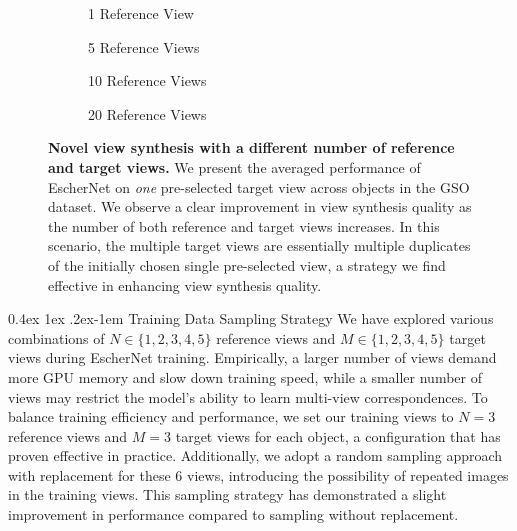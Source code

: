 \documentclass[10pt,twocolumn,letterpaper]{article}
\makeatletter
\renewcommand{\paragraph}{%
  \@startsection{paragraph}{4}%
  {\z@}{0.4ex \@plus 1ex \@minus .2ex}{-1em}%
  {\normalfont\normalsize\bfseries}%
}
\makeatother
\begin{document}
\begin{figure}[ht!]
  \flushleft
  \captionsetup[subfigure]{font=footnotesize}
  \begin{subfigure}[b]{0.24\linewidth}
  \centering
    \resizebox{\linewidth}{!}{{}}
  \caption{1 Reference View}
  \end{subfigure}\hfill
  \begin{subfigure}[b]{0.24\linewidth}
  \centering
    \resizebox{\linewidth}{!}{{}}
  \caption{5 Reference Views}
  \end{subfigure}\hfill
    \begin{subfigure}[b]{0.24\linewidth}
  \centering
    \resizebox{\linewidth}{!}{{}}
  \caption{10 Reference Views}
  \end{subfigure}
  \hfill
    \begin{subfigure}[b]{0.24\linewidth}
  \centering
    \resizebox{\linewidth}{!}{{}}
  \caption{20 Reference Views}
  \end{subfigure}
  \caption{{\bf Novel view synthesis with a different number of reference and target views.} We present the averaged performance of EscherNet on {\it one} pre-selected target view across objects in the GSO dataset. We observe a clear improvement in view synthesis quality as the number of both reference and target views increases. In this scenario, the multiple target views are essentially multiple duplicates of the initially chosen single pre-selected view, a strategy we find effective in enhancing view synthesis quality.}
  \label{fig:analysis}
\end{figure}


\paragraph{Training Data Sampling Strategy}
We have explored various combinations of $N\in\{1,2,3,4,5\}$ reference views and $M\in\{1,2,3,4,5\}$ target views during EscherNet training. Empirically, a larger number of views demand more GPU memory and slow down training speed, while a smaller number of views may restrict the model's ability to learn multi-view correspondences. To balance training efficiency and performance, we set our training views to $N=3$ reference views and $M=3$ target views for each object, a configuration that has proven effective in practice. Additionally, we adopt a random sampling approach with replacement for these 6 views, introducing the possibility of repeated images in the training views. This sampling strategy has demonstrated a slight improvement in performance compared to sampling without replacement.
\end{document}
